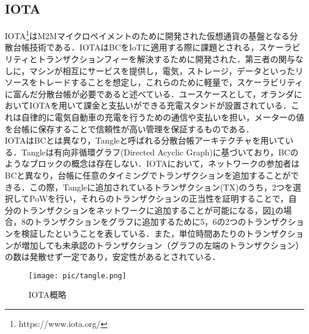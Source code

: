 \documentclass[japanese, macos]{KU2}
\begin{document}
\subsection{IOTA}
IOTA\footnote{https://www.iota.org/}はM2Mマイクロペイメントのために開発された仮想通貨の基盤となる分散台帳技術である．IOTAはBCをIoTに適用する際に課題とされる，スケーラビリティとトランザクションフィーを解決するために開発された．第三者の関与なしに，マシンが相互にサービスを提供し，電気，ストレージ，データといったリソースをトレードすることを想定し，これらのために軽量で，スケーラビリティに富んだ分散台帳が必要であると述べている．ユースケースとして，オランダにおいてIOTAを用いて課金と支払いができる充電スタンドが設置されている．これは自律的に電気自動車の充電を行うための通信や支払いを担い，メーターの値を台帳に保存することで信頼性が高い管理を保証するものである．\\
IOTAはBCとは異なり，Tangleと呼ばれる分散台帳アーキテクチャを用いている．Tangleは有向非循環グラフ(Directed Acyclic Graph)に基づいており，BCのようなブロックの概念は存在しない．IOTAにおいて，ネットワークの参加者はBCと異なり，台帳に任意のタイミングでトランザクションを追加することができる．この際，Tangleに追加されているトランザクション(TX)のうち，2つを選択してPoWを行い，それらのトランザクションの正当性を証明することで，自分のトランザクションをネットワークに追加することが可能になる，図\ref{fig:tangle}の場合，8のトランザクションをグラフに追加するために5，6の2つのトランザクションを検証したということを表している．また，単位時間あたりのトランザクションが増加しても未承認のトランザクション（グラフの左端のトランザクション）の数は発散せず一定であり，安定性があるとされている\cite{kusmierz2017first}．\\

\begin{figure}[htbp]
  \begin{center} 
    \texttt{[image: pic/tangle.png]}
    \caption{IOTA概略}
    \label{fig:tangle} 
  \end{center}
\end{figure}
\end{document}
